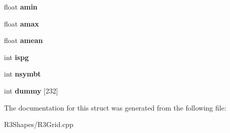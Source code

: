 \begin{DoxyCompactItemize}
\item 
float {\bfseries amin}\hypertarget{struct_r3_grid_c_c_p4_header_ad94936a2e3b3bf53b58f573abdf59a25}{}\label{struct_r3_grid_c_c_p4_header_ad94936a2e3b3bf53b58f573abdf59a25}

\item 
float {\bfseries amax}\hypertarget{struct_r3_grid_c_c_p4_header_ac0002ae65d117b455232365b74f46085}{}\label{struct_r3_grid_c_c_p4_header_ac0002ae65d117b455232365b74f46085}

\item 
float {\bfseries amean}\hypertarget{struct_r3_grid_c_c_p4_header_aae995179edbc20b872574f5389a94990}{}\label{struct_r3_grid_c_c_p4_header_aae995179edbc20b872574f5389a94990}

\item 
int {\bfseries ispg}\hypertarget{struct_r3_grid_c_c_p4_header_af9003a5306e0afb77efb4fe3c619c11f}{}\label{struct_r3_grid_c_c_p4_header_af9003a5306e0afb77efb4fe3c619c11f}

\item 
int {\bfseries nsymbt}\hypertarget{struct_r3_grid_c_c_p4_header_af31cb0edcb76c6231bf34b5d9e72bcac}{}\label{struct_r3_grid_c_c_p4_header_af31cb0edcb76c6231bf34b5d9e72bcac}

\item 
int {\bfseries dummy} \mbox{[}232\mbox{]}\hypertarget{struct_r3_grid_c_c_p4_header_a576c22453217e6a769d7341d9d57446a}{}\label{struct_r3_grid_c_c_p4_header_a576c22453217e6a769d7341d9d57446a}

\end{DoxyCompactItemize}


The documentation for this struct was generated from the following file\+:\begin{DoxyCompactItemize}
\item 
R3\+Shapes/R3\+Grid.\+cpp\end{DoxyCompactItemize}
